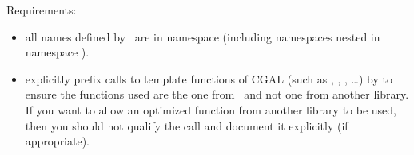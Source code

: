 Requirements:
\begin{itemize}
\item all names defined by \cgal\ are in namespace 
  (including namespaces nested in namespace ).
\item explicitly prefix calls to template functions of CGAL
(such as , , , \dots) by 
to ensure the functions used are the one from \cgal\ and not one from another
library. If you want to allow an optimized function from another library
to be used, then you should not qualify the call and document it explicitly
 (if appropriate).
\end{itemize}



